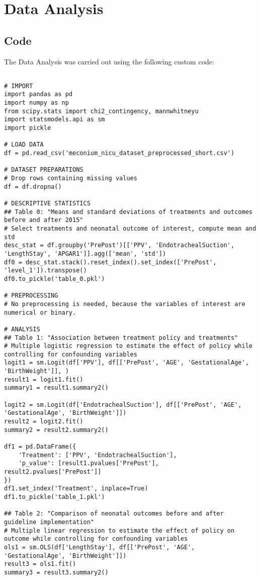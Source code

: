 \documentclass[11pt]{article}
\begin{document}
\section{Data Analysis} \subsection{Code}The Data Analysis was carried out using the following custom code:

\begin{verbatim}

# IMPORT
import pandas as pd
import numpy as np
from scipy.stats import chi2_contingency, mannwhitneyu
import statsmodels.api as sm
import pickle

# LOAD DATA
df = pd.read_csv('meconium_nicu_dataset_preprocessed_short.csv')

# DATASET PREPARATIONS
# Drop rows containing missing values
df = df.dropna()

# DESCRIPTIVE STATISTICS
## Table 0: "Means and standard deviations of treatments and outcomes before and after 2015"
# Select treatments and neonatal outcome of interest, compute mean and std
desc_stat = df.groupby('PrePost')[['PPV', 'EndotrachealSuction', 'LengthStay', 'APGAR1']].agg(['mean', 'std'])
df0 = desc_stat.stack().reset_index().set_index(['PrePost', 'level_1']).transpose()
df0.to_pickle('table_0.pkl')

# PREPROCESSING 
# No preprocessing is needed, because the variables of interest are numerical or binary.

# ANALYSIS
## Table 1: "Association between treatment policy and treatments"
# Multiple logistic regression to estimate the effect of policy while controlling for confounding variables
logit1 = sm.Logit(df['PPV'], df[['PrePost', 'AGE', 'GestationalAge', 'BirthWeight']], )
result1 = logit1.fit()
summary1 = result1.summary2()

logit2 = sm.Logit(df['EndotrachealSuction'], df[['PrePost', 'AGE', 'GestationalAge', 'BirthWeight']])
result2 = logit2.fit()
summary2 = result2.summary2()

df1 = pd.DataFrame({
    'Treatment': ['PPV', 'EndotrachealSuction'],
    'p_value': [result1.pvalues['PrePost'], result2.pvalues['PrePost']]
})
df1.set_index('Treatment', inplace=True)
df1.to_pickle('table_1.pkl')

## Table 2: "Comparison of neonatal outcomes before and after guideline implementation"
# Multiple linear regression to estimate the effect of policy on outcome while controlling for confounding variables
ols1 = sm.OLS(df['LengthStay'], df[['PrePost', 'AGE', 'GestationalAge', 'BirthWeight']])
result3 = ols1.fit()
summary3 = result3.summary2()


\end{verbatim}
\end{document}
